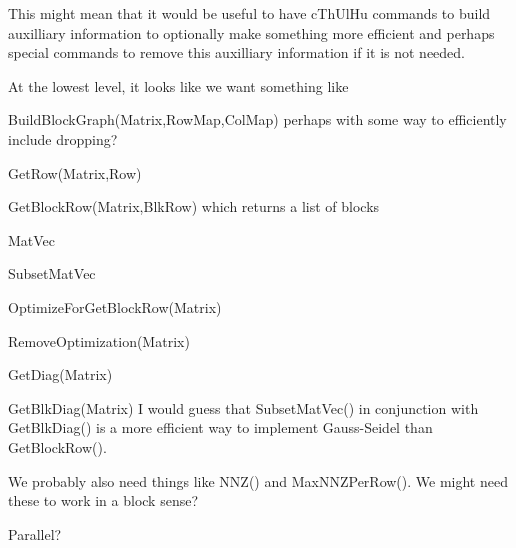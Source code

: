 \item This might mean that it would be useful to have cThUlHu commands to
   build auxilliary information to optionally make something more efficient 
   and perhaps special commands to remove this auxilliary information 
   if it is not needed.
\ee

At the lowest level, it looks like we want something like
\be
   \item BuildBlockGraph(Matrix,RowMap,ColMap) perhaps with some way to efficiently include dropping? 
   \item GetRow(Matrix,Row) 
   \item GetBlockRow(Matrix,BlkRow) which returns a list of blocks
   \item MatVec
   \item SubsetMatVec
   \item OptimizeForGetBlockRow(Matrix)
   \item RemoveOptimization(Matrix)
   \item GetDiag(Matrix)
   \item GetBlkDiag(Matrix)
\ee
I would guess that SubsetMatVec() in conjunction with GetBlkDiag() is a more
efficient way to implement Gauss-Seidel than GetBlockRow().

We probably also need things like NNZ() and MaxNNZPerRow(). We might need 
these to work in a block sense?

Parallel?

